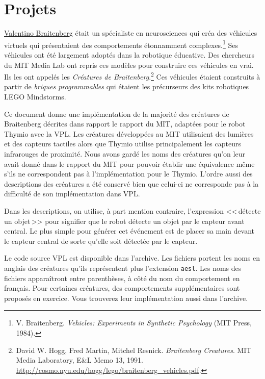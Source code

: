 \part{Projets}

\label{ch.brait}


\href{http://fr.wikipedia.org/wiki/Valentino_Braitenberg}{Valentino Braitenberg}
était un spécialiste en neurosciences qui créa des véhicules virtuels
qui présentaient des comportements étonnamment complexes.\footnote{V. Braitenberg.
\textit{Vehicles: Experiments in Synthetic Psychology} (MIT Press, 1984).}
Ses véhicules ont été largement adoptés dans la robotique éducative.
Des chercheurs du MIT Media Lab ont repris ces modèles pour construire ces véhicules en vrai.
Ils les ont appelés les \emph{Créatures de Braitenberg}.\footnote{David W. Hogg, Fred Martin,
Mitchel Resnick. \textit{Braitenberg Creatures}. MIT Media Laboratory, E\&L Memo 13, 1991.
\href{http://cosmo.nyu.edu/hogg/lego/braitenberg_vehicles.pdf}{http://cosmo.nyu.edu/hogg/lego/braitenberg\_vehicles.pdf}.}
Ces véhicules étaient construits à partir de \emph{briques programmables} qui étaient les
précurseurs des kits robotiques LEGO Mindstorms.

Ce document donne une implémentation de la majorité des créatures de Braitenberg décrites dans
rapport le rapport du MIT, adaptées pour le robot Thymio avec la VPL.
Les créatures développées au MIT utilisaient des lumières et des capteurs tactiles
alors que Thymio utilise principalement les capteurs infrarouges de proximité.
Nous avons gardé les noms des créatures
qu'on leur avait donné dans le rapport du MIT pour pouvoir établir une équivalence même s'ils ne correspondent pas à l'implémentation pour le Thymio.
L'ordre aussi des descriptions des créatures a été conservé
bien que celui-ci ne corresponde pas à la difficulté de son implémentation dans VPL.

Dans les descriptions, on utilise, à part mention contraire,
l'expression <<\,détecte un objet\,>> pour signifier
que le robot détecte un objet par le capteur avant central.
Le plus simple pour générer cet événement est de placer sa main
devant le capteur central
de sorte qu'elle soit détectée par le capteur.

Le code source VPL est disponible dans l'archive.
Les fichiers portent les noms en anglais des créatures qu'ils représentent
plus l'extension \texttt{\small aesl}.
Les noms des fichiers apparaîtront entre parenthèses, à côté du nom du comportement en français.
Pour certaines créatures, des comportements supplémentaires sont proposés en exercice.
Vous trouverez leur implémentation aussi dans l'archive.

